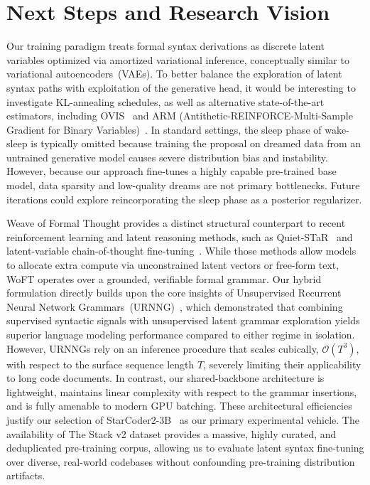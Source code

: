 \documentclass[11pt]{article}
\theoremstyle{plain}
\theoremstyle{definition}
\begin{document}
\section{Next Steps and Research Vision}
\label{sec:conclusion}

Our training paradigm treats formal syntax derivations as discrete latent
variables optimized via amortized variational inference, conceptually similar to
variational autoencoders~(VAEs). To better balance the exploration of latent
syntax paths with exploitation of the generative head, it would be interesting
to investigate KL-annealing schedules, as well as alternative state-of-the-art
estimators, including OVIS~\cite{ovis-2020} and ARM
(Antithetic-REINFORCE-Multi-Sample Gradient for Binary
Variables)~\cite{arm-2019}. In standard settings, the sleep phase of wake-sleep
is typically omitted because training the proposal on dreamed data from an
untrained generative model causes severe distribution bias and instability.
However, because our approach fine-tunes a highly capable pre-trained base
model, data sparsity and low-quality dreams are not primary bottlenecks. Future
iterations could explore reincorporating the sleep phase as a posterior
regularizer.

Weave of Formal Thought provides a distinct structural counterpart to recent
reinforcement learning and latent reasoning methods, such as
Quiet-STaR~\cite{quiet-star} and latent-variable chain-of-thought
fine-tuning~\cite{phanTrainingChainofThoughtLatentVariable2023}. While those
methods allow models to allocate extra compute via unconstrained latent vectors
or free-form text, WoFT operates over a grounded, verifiable formal grammar. Our
hybrid formulation directly builds upon the core insights of Unsupervised
Recurrent Neural Network Grammars~(URNNG)~\cite{kim-etal-2019}, which
demonstrated that combining supervised syntactic signals with unsupervised
latent grammar exploration yields superior language modeling performance
compared to either regime in isolation. However, URNNGs rely on an inference
procedure that scales cubically, \(\mathcal{O}(T^3)\), with respect to the
surface sequence length \(T\), severely limiting their applicability to long
code documents. In contrast, our shared-backbone architecture is lightweight,
maintains linear complexity with respect to the grammar insertions, and is fully
amenable to modern GPU batching. These architectural efficiencies justify our
selection of StarCoder2-3B~\cite{starcoder2-2024} as our primary experimental
vehicle. The availability of The Stack v2 dataset provides a massive, highly
curated, and deduplicated pre-training corpus, allowing us to evaluate latent
syntax fine-tuning over diverse, real-world codebases without confounding
pre-training distribution artifacts.
\end{document}
